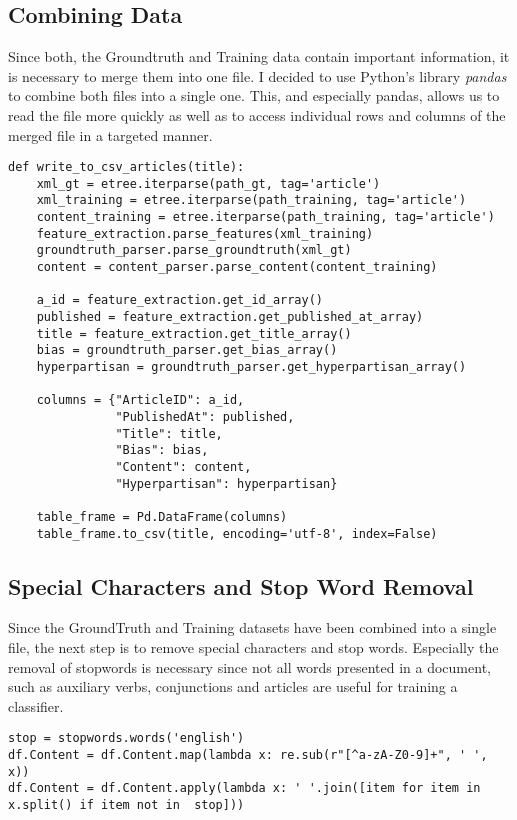 \documentclass[a4paper, 11pt,titlepage,oneside,openany]{book}
\begin{document}
\subsection{Combining Data}
Since both, the Groundtruth and Training data contain important information, it is necessary to merge them into one file. I decided to use Python's library \textit{pandas} \cite{pandas} to combine both files into a single one. This, and especially pandas, allows us to read the file more quickly as well as to access individual rows and columns of the merged file in a targeted manner.
\begin{lstlisting}[caption=Merge GroundTruth and Training datasets]
def write_to_csv_articles(title):
    xml_gt = etree.iterparse(path_gt, tag='article')
    xml_training = etree.iterparse(path_training, tag='article')
    content_training = etree.iterparse(path_training, tag='article')
    feature_extraction.parse_features(xml_training)
    groundtruth_parser.parse_groundtruth(xml_gt)
    content = content_parser.parse_content(content_training)

    a_id = feature_extraction.get_id_array()
    published = feature_extraction.get_published_at_array)
    title = feature_extraction.get_title_array()
    bias = groundtruth_parser.get_bias_array()
    hyperpartisan = groundtruth_parser.get_hyperpartisan_array()

    columns = {"ArticleID": a_id,
               "PublishedAt": published,
               "Title": title,
               "Bias": bias,
               "Content": content,
               "Hyperpartisan": hyperpartisan}

    table_frame = Pd.DataFrame(columns)
    table_frame.to_csv(title, encoding='utf-8', index=False)
\end{lstlisting}


\subsection{Special Characters and Stop Word Removal}
Since the GroundTruth and Training datasets have been combined into a single file, the next step  is to remove special characters and stop words. Especially the removal of stopwords is necessary since not all words presented in a document, such as auxiliary verbs, conjunctions and articles \cite{textclassification} are useful for training a classifier.
\begin{lstlisting}[caption=Special Characters and Stop Word Removal]
stop = stopwords.words('english')
df.Content = df.Content.map(lambda x: re.sub(r"[^a-zA-Z0-9]+", ' ', x))
df.Content = df.Content.apply(lambda x: ' '.join([item for item in x.split() if item not in  stop]))
\end{lstlisting}
\end{document}
